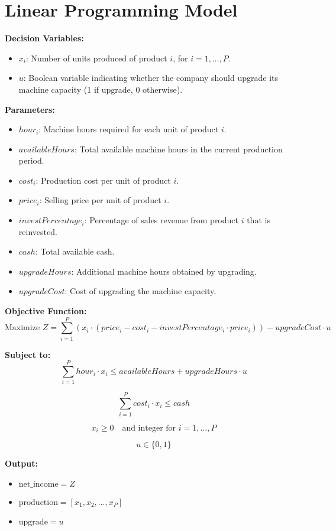 \documentclass{article}
\begin{document}
\section*{Linear Programming Model}

\textbf{Decision Variables:}
\begin{itemize}
    \item $x_i$: Number of units produced of product $i$, for $i = 1, \ldots, P$.
    \item $u$: Boolean variable indicating whether the company should upgrade its machine capacity (1 if upgrade, 0 otherwise).
\end{itemize}

\textbf{Parameters:}
\begin{itemize}
    \item $hour_i$: Machine hours required for each unit of product $i$.
    \item $availableHours$: Total available machine hours in the current production period.
    \item $cost_i$: Production cost per unit of product $i$.
    \item $price_i$: Selling price per unit of product $i$.
    \item $investPercentage_i$: Percentage of sales revenue from product $i$ that is reinvested.
    \item $cash$: Total available cash.
    \item $upgradeHours$: Additional machine hours obtained by upgrading.
    \item $upgradeCost$: Cost of upgrading the machine capacity.
\end{itemize}

\textbf{Objective Function:}
\[
\text{Maximize } Z = \sum_{i=1}^P \left( x_i \cdot (price_i - cost_i - investPercentage_i \cdot price_i) \right) - upgradeCost \cdot u
\]

\textbf{Subject to:}
\[
\sum_{i=1}^P hour_i \cdot x_i \leq availableHours + upgradeHours \cdot u
\]

\[
\sum_{i=1}^P cost_i \cdot x_i \leq cash
\]

\[
x_i \geq 0 \quad \text{and integer for } i = 1, \ldots, P
\]

\[
u \in \{0, 1\}
\]

\textbf{Output:}
\begin{itemize}
    \item $\text{net\_income} = Z$
    \item $\text{production} = [x_1, x_2, \ldots, x_P]$
    \item $\text{upgrade} = u$
\end{itemize}
\end{document}

